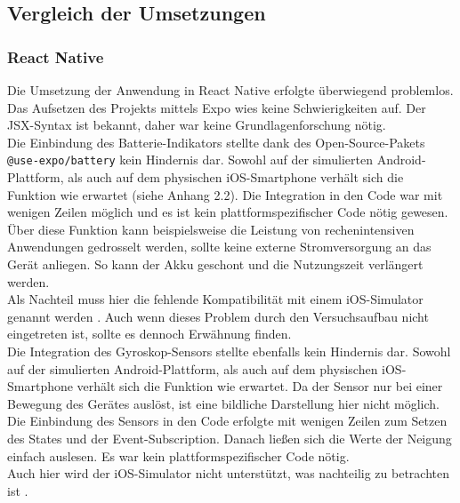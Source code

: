 \documentclass[a4paper]{scrartcl}
\begin{document}
 \newpage
 
\subsection{Vergleich der Umsetzungen}

\subsubsection{React Native}

Die Umsetzung der Anwendung in React Native erfolgte überwiegend problemlos. Das Aufsetzen des Projekts mittels Expo wies keine Schwierigkeiten auf. Der JSX-Syntax ist bekannt, daher war keine Grundlagenforschung nötig. \\

Die Einbindung des Batterie-Indikators stellte dank des Open-Source-Pakets \texttt{@use-expo/battery} kein Hindernis dar. Sowohl auf der simulierten Android-Plattform, als auch auf dem physischen iOS-Smartphone verhält sich die Funktion wie erwartet (siehe Anhang 2.2). Die Integration in den Code war mit wenigen Zeilen möglich und es ist kein plattformspezifischer Code nötig gewesen. Über diese Funktion kann beispielsweise die Leistung von rechenintensiven Anwendungen gedrosselt werden, sollte keine externe Stromversorgung an das Gerät anliegen. So kann der Akku geschont und die Nutzungszeit verlängert werden. \\
Als Nachteil muss hier die fehlende Kompatibilität mit einem iOS-Simulator genannt werden \autocite{Expo_battery}. Auch wenn dieses Problem durch den Versuchsaufbau nicht eingetreten ist, sollte es dennoch Erwähnung finden. \\

Die Integration des Gyroskop-Sensors stellte ebenfalls kein Hindernis dar. Sowohl auf der simulierten Android-Plattform, als auch auf dem physischen iOS-Smartphone verhält sich die Funktion wie erwartet. Da der Sensor nur bei einer Bewegung des Gerätes auslöst, ist eine bildliche Darstellung hier nicht möglich. Die Einbindung des Sensors in den Code erfolgte mit wenigen Zeilen zum Setzen des States und der Event-Subscription. Danach ließen sich die Werte der Neigung einfach auslesen. Es war kein plattformspezifischer Code nötig. \\
Auch hier wird der iOS-Simulator nicht unterstützt, was nachteilig zu betrachten ist \autocite{Expo_gyroscope}. \\
\end{document}
